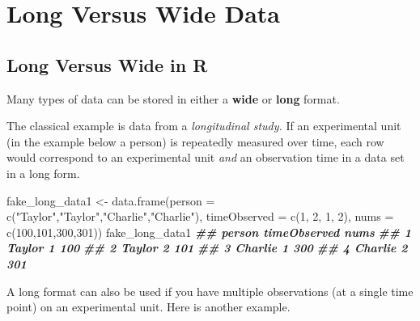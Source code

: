 \documentclass[
  12pt,
]{krantz}
\makeatletter
\newenvironment{Shaded}{\begin{snugshade}}{\end{snugshade}}
\newcommand{\AttributeTok}[1]{\textcolor[rgb]{0.61,0.61,0.61}{#1}}
\newcommand{\DecValTok}[1]{\textcolor[rgb]{0.06,0.06,0.06}{#1}}
\newcommand{\DocumentationTok}[1]{\textcolor[rgb]{0.37,0.37,0.37}{\textbf{\textit{#1}}}}
\newcommand{\FunctionTok}[1]{\textcolor[rgb]{0,0,0}{#1}}
\newcommand{\NormalTok}[1]{#1}
\newcommand{\OtherTok}[1]{\textcolor[rgb]{0.37,0.37,0.37}{#1}}
\newcommand{\StringTok}[1]{\textcolor[rgb]{0.5,0.5,0.5}{#1}}
\newenvironment{kframe}{%
\medskip{}
\setlength{\fboxsep}{.8em}
 \def\at@end@of@kframe{}%
 \ifinner\ifhmode%
  \def\at@end@of@kframe{\end{minipage}}%
  \begin{minipage}{\columnwidth}%
 \fi\fi%
 \def\FrameCommand##1{\hskip\@totalleftmargin \hskip-\fboxsep
 \colorbox{shadecolor}{##1}\hskip-\fboxsep
     \hskip-\linewidth \hskip-\@totalleftmargin \hskip\columnwidth}%
 \MakeFramed {\advance\hsize-\width
   \@totalleftmargin\z@ \linewidth\hsize
   \@setminipage}}%
 {\par\unskip\endMakeFramed%
 \at@end@of@kframe}
\renewenvironment{Shaded}{\begin{kframe}}{\end{kframe}}
\makeatother
\begin{document}
\hypertarget{long-versus-wide-data}{%
\section{Long Versus Wide Data}\label{long-versus-wide-data}}

\hypertarget{long-versus-wide-in-r}{%
\subsection{Long Versus Wide in R}\label{long-versus-wide-in-r}}

Many types of data can be stored in either a \textbf{wide} or \textbf{long} format.

The classical example is data from a \emph{longitudinal study.} If an experimental unit (in the example below a person) is repeatedly measured over time, each row would correspond to an experimental unit \emph{and} an observation time in a data set in a long form.

\begin{Shaded}
\begin{Highlighting}[]
\NormalTok{fake\_long\_data1 }\OtherTok{\textless{}{-}} \FunctionTok{data.frame}\NormalTok{(}\AttributeTok{person =} \FunctionTok{c}\NormalTok{(}\StringTok{"Taylor"}\NormalTok{,}\StringTok{"Taylor"}\NormalTok{,}\StringTok{"Charlie"}\NormalTok{,}\StringTok{"Charlie"}\NormalTok{), }
                             \AttributeTok{timeObserved =} \FunctionTok{c}\NormalTok{(}\DecValTok{1}\NormalTok{, }\DecValTok{2}\NormalTok{, }\DecValTok{1}\NormalTok{, }\DecValTok{2}\NormalTok{),}
                             \AttributeTok{nums =} \FunctionTok{c}\NormalTok{(}\DecValTok{100}\NormalTok{,}\DecValTok{101}\NormalTok{,}\DecValTok{300}\NormalTok{,}\DecValTok{301}\NormalTok{))}
\NormalTok{fake\_long\_data1}
\DocumentationTok{\#\#    person timeObserved nums}
\DocumentationTok{\#\# 1  Taylor            1  100}
\DocumentationTok{\#\# 2  Taylor            2  101}
\DocumentationTok{\#\# 3 Charlie            1  300}
\DocumentationTok{\#\# 4 Charlie            2  301}
\end{Highlighting}
\end{Shaded}

A long format can also be used if you have multiple observations (at a single time point) on an experimental unit. Here is another example.
\end{document}
